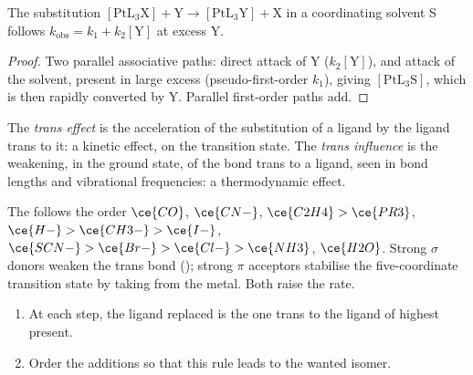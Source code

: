 \begin{proposition}\label{prop:b3:complex-mechanisms:square-planar}
The substitution $\mathrm{[PtL_3X] + Y \to [PtL_3Y] + X}$ in a coordinating solvent S follows
$k_{\mathrm{obs}} = k_1 + k_2[\mathrm Y]$ at excess Y.
\end{proposition}

\begin{proof}
Two parallel associative paths: direct attack of Y ($k_2[\mathrm Y]$), and attack of the
solvent, present in large excess (pseudo-first-order $k_1$), giving $[\mathrm{PtL_3S}]$, which
is then rapidly converted by Y. Parallel first-order paths add.
\end{proof}

\begin{definition}\label{def:b3:complex-mechanisms:trans-effect}
The \emph{trans effect} is the acceleration of the substitution
of a ligand by the ligand trans to it: a kinetic effect, on the transition state.
The \emph{trans influence} is the weakening, in the ground
state, of the bond trans to a ligand, seen in bond lengths and vibrational
frequencies: a thermodynamic effect.
\end{definition}

The  follows the order $\ce{CO}$, $\ce{CN-}$, $\ce{C2H4} > \ce{PR3}$, $\ce{H-} > \ce{CH3-} > \ce{I-}$, $\ce{SCN-} >
\ce{Br-} > \ce{Cl-} > \ce{NH3}$, $\ce{H2O}$. Strong $\sigma$ donors weaken the trans bond ();
strong $\pi$ acceptors stabilise the five-coordinate transition state by taking
 from the metal. Both raise the rate.

\begin{method}\label{met:b3:complex-mechanisms:pt-synthesis}
\begin{enumerate}
  \item At each step, the ligand replaced is the one trans to the ligand of
        highest  present.
  \item Order the additions so that this rule leads to the wanted isomer.
\end{enumerate}
\end{method}

